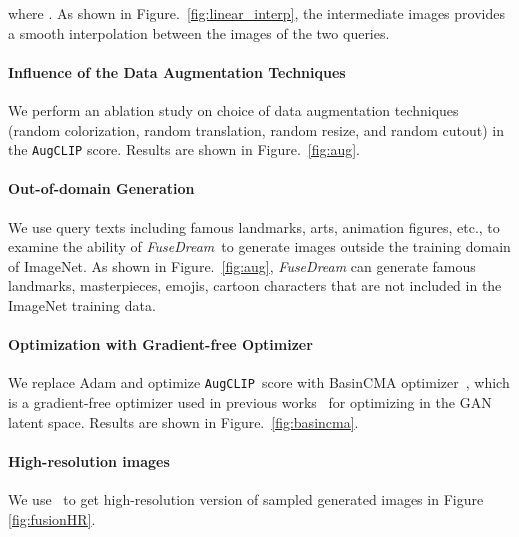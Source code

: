 \documentclass[10pt,twocolumn,letterpaper]{article}
\newcommand{\our}{\emph{FuseDream}}
\newcommand{\ourloss}{\texttt{AugCLIP}}
\begin{document}
 where . 
As shown in Figure.~\ref{fig:linear_interp}, 
the intermediate images provides a smooth 
interpolation between the images of the two queries. 
\vspace{.5\baselineskip}

\paragraph{Influence of the Data Augmentation Techniques} We perform an ablation study on choice of  data augmentation techniques (random colorization, random translation, random resize, and random cutout) in the {\ourloss} score.  Results are shown in Figure.~\ref{fig:aug}. 

\vspace{.5\baselineskip}

\paragraph{Out-of-domain Generation} We use query texts including famous landmarks, arts, animation figures, etc., to examine the ability of \our~to generate images outside the training domain of ImageNet. 
As shown in Figure.~\ref{fig:aug}, 
{\our} can generate famous landmarks, masterpieces, emojis, cartoon characters that 
are not included in the ImageNet training data. 
\vspace{.5\baselineskip}

\paragraph{Optimization with Gradient-free Optimizer}
We replace Adam and optimize \ourloss~score with BasinCMA optimizer~\cite{wampler2009optimal}, which is a gradient-free optimizer used in previous works~\cite{huh2020transforming, bau2019seeing} for optimizing in the GAN latent space. Results are shown in Figure.~\ref{fig:basincma}.
\vspace{.5\baselineskip}

\paragraph{High-resolution images} We use~\cite{wang2021realesrgan} to get high-resolution version of sampled generated images in Figure \ref{fig:fusionHR}.
\end{document}
